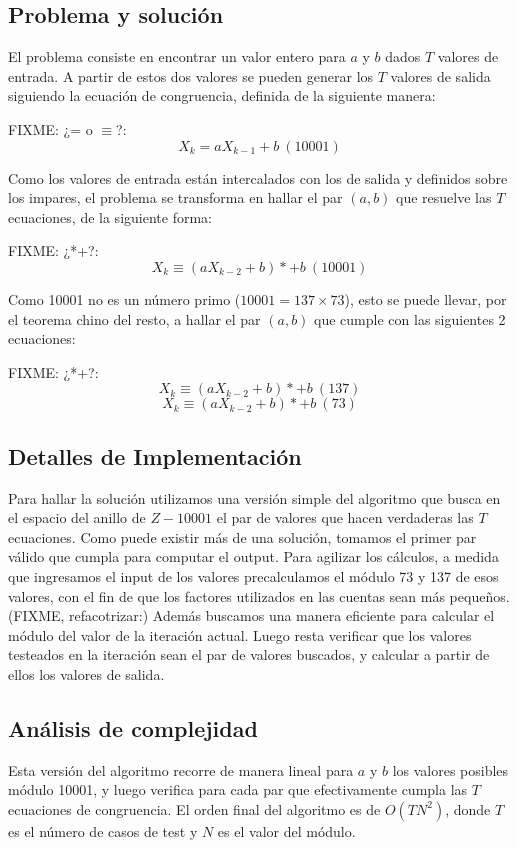 \subsection*{Problema y solución}

El problema consiste en encontrar un valor entero para $a$ y $b$ dados $T$
valores de entrada. A partir de estos dos valores se pueden generar los $T$
valores de salida siguiendo la ecuación de congruencia, definida de la
siguiente manera:

FIXME: ¿= o $\equiv$?:
$$X_k = aX_{k-1} + b\ (10001)$$

Como los valores de entrada están intercalados con los de salida y definidos
sobre los impares, el problema se transforma en hallar el par $(a,b)$ que
resuelve las $T$ ecuaciones, de la siguiente forma:

FIXME: ¿*+?:
$$X_k \equiv (aX_{k-2} + b) * + b\ (10001)$$

Como 10001 no es un número primo ($10001 = 137\times 73$), esto se puede
llevar, por el teorema chino del resto, a hallar el par $(a,b)$ que cumple con
las siguientes 2 ecuaciones:

FIXME: ¿*+?: 
$$X_k \equiv (aX_{k-2} + b) * + b\ (137)$$
$$X_k \equiv (aX_{k-2} + b) * + b\ (73)$$


\subsection*{Detalles de Implementación}

Para hallar la solución utilizamos una versión simple del algoritmo que busca
en el espacio del anillo de $Z-10001$ el par de valores que hacen verdaderas
las $T$ ecuaciones. Como puede existir más de una solución, tomamos el primer
par válido que cumpla para computar el output. Para agilizar los cálculos, a
medida que ingresamos el input de los valores precalculamos el módulo 73 y 137
de esos valores, con el fin de que los factores utilizados en las cuentas sean
más pequeños. (FIXME, refacotrizar:) Además buscamos una manera eficiente para
calcular el módulo del valor de la iteración actual. Luego resta verificar que
los valores testeados en la iteración sean el par de valores buscados, y
calcular a partir de ellos los valores de salida.


\subsection*{Análisis de complejidad}

Esta versión del algoritmo recorre de manera lineal para $a$ y $b$ los valores
posibles módulo 10001, y luego verifica para cada par que efectivamente cumpla
las $T$ ecuaciones de congruencia. El orden final del algoritmo es de
$O(TN^2)$, donde $T$ es el número de casos de test y $N$ es el valor del módulo.
